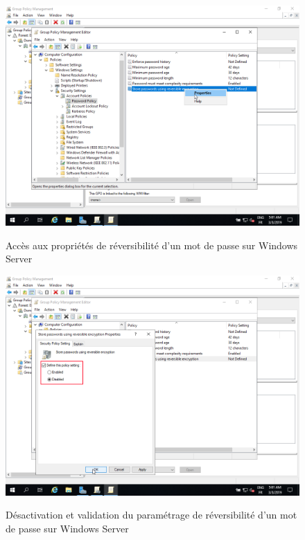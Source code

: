 \begin{figure}[h!]
	\begin{center}
		\caption{Accès aux propriétés de réversibilité d'un mot de passe sur Windows Server}
		\includegraphics[scale=0.5]{WS_Screenshots/gpo_12.png}
		\label{WS_Screenshots/gpo_12}
	\end{center}
\end{figure}
\FloatBarrier 
    

\begin{figure}[h!]
	\begin{center}
		\caption{Désactivation et validation du paramétrage de réversibilité d'un mot de passe sur Windows Server}
		\includegraphics[scale=0.5]{WS_Screenshots/gpo_13.png}
		\label{WS_Screenshots/gpo_13}
	\end{center}
\end{figure}
\FloatBarrier 
    
